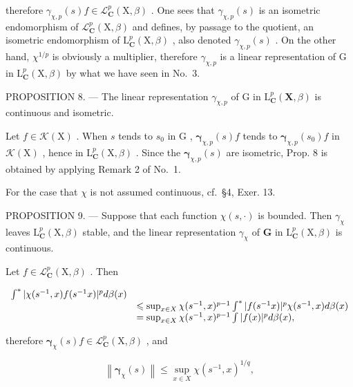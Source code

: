 therefore \(\gamma_{\chi,p}(s)f\in\mathcal{L}_{\mathbf{C}}^{p}(\mathrm{X},\beta)\) . One sees that \(\gamma_{\chi,p}(s)\) is an isometric endomorphism of \(\mathcal{L}_{\mathbf{C}}^{p}(\mathrm{X},\beta)\) and defines, by passage to the quotient, an isometric endomorphism of \(\mathrm{L}_{\mathbf{C}}^{p}(\mathrm{X},\beta)\) , also denoted \(\gamma_{\chi,p}(s)\) . On the other hand, \(\chi^{1/p}\) is obviously a multiplier, therefore \(\gamma_{\chi,p}\) is a linear representation of G in \(\mathrm{L}_{\mathbf{C}}^{p}(\mathrm{X},\beta)\) by what we have seen in No.~3.

PROPOSITION 8. --- The linear representation \(\gamma_{\chi,p}\) of G in \(\mathrm{L}_{\mathbf{C}}^{p}(\mathbf{X},\beta)\) is continuous and isometric.

Let \(f \in \mathcal{K}(\mathrm{X})\) . When \(s\) tends to \(s_0\) in \(\mathrm{G}\) , \(\boldsymbol{\gamma}_{\chi,p}(s)f\) tends to \(\boldsymbol{\gamma}_{\chi,p}(s_0)f\) in \(\mathcal{K}(\mathrm{X})\) , hence in \(\mathrm{L}_{\mathbf{C}}^p (\mathrm{X},\beta)\) . Since the \(\boldsymbol{\gamma}_{\chi,p}(s)\) are isometric, Prop. 8 is obtained by applying Remark 2 of No.~1.

For the case that \(\chi\) is not assumed continuous, cf.~§4, Exer. 13.

PROPOSITION 9. --- Suppose that each function \(\chi(s,\cdot)\) is bounded. Then \(\gamma_{\chi}\) leaves \(\mathrm{L}_{\mathbf{C}}^{p}(\mathrm{X},\beta)\) stable, and the linear representation \(\gamma_{\chi}\) of \(\mathbf{G}\) in \(\mathrm{L}_{\mathbf{C}}^{p}(\mathrm{X},\beta)\) is continuous.

Let \(f\in \mathcal{L}_{\mathbf{C}}^{p}(\mathrm{X},\beta)\) . Then

\[
\begin{array}{r l} \int^ {*} | \chi (s ^ {- 1}, x) f (s ^ {- 1} x) | ^ {p} d \beta (x) \\ & \leqslant \sup _ {x \in X} \chi (s ^ {- 1}, x) ^ {p - 1} \int^ {*} | f (s ^ {- 1} x) | ^ {p} \chi (s ^ {- 1}, x) d \beta (x) \\ & = \sup _ {x \in X} \chi (s ^ {- 1}, x) ^ {p - 1} \int | f (x) | ^ {p} d \beta (x), \end{array}
\]

therefore \(\pmb{\gamma}_{\chi}(s)f\in \mathcal{L}_{\mathbf{C}}^{p}(\mathrm{X},\beta)\) , and

\[
\left\| \boldsymbol {\gamma} _ {\chi} (s) \right\| \leqslant \sup _ {x \in X} \chi (s ^ {- 1}, x) ^ {1 / q},\tag{5}
\]

